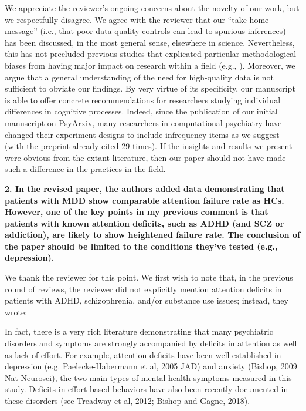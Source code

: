 \documentclass[a4paper,notitlepage,12pt]{article}
\begin{document}
We appreciate the reviewer's ongoing concerns about the novelty of our work, but we respectfully disagree. We agree with the reviewer that our ``take-home message'' (i.e., that poor data quality controls can lead to spurious inferences) has been discussed, in the most general sense, elsewhere in science. Nevertheless, this has not precluded previous studies that explicated particular methodological biases from having major impact on research within a field (e.g., \cite{eklund2016cluster, bradley2021unrepresentative}). Moreover, we argue that a general understanding of the need for high-quality data is not sufficient to obviate our findings. By very virtue of its specificity, our manuscript is able to offer concrete recommendations for researchers studying individual differences in cognitive processes. Indeed, since the publication of our initial manuscript on PsyArxiv, many researchers in computational psychiatry have changed their experiment designs to include infrequency items as we suggest (with the preprint already cited 29 times). If the insights and results we present were obvious from the extant literature, then our paper should not have made such a difference in the practices in the field.

\textbf{2. In the revised paper, the authors added data demonstrating that patients with MDD show comparable attention failure rate as HCs. However, one of the key points in my previous comment is that patients with known attention deficits, such as ADHD (and SCZ or addiction), are likely to show heightened failure rate. The conclusion of the paper should be limited to the conditions they've tested (e.g., depression).}

We thank the reviewer for this point. We first wish to note that, in the previous round of reviews, the reviewer did not explicitly mention attention deficits in patients with ADHD, schizophrenia, and/or substance use issues; instead, they wrote:

\begin{displayquote}
    In fact, there is a very rich literature demonstrating that many psychiatric disorders and symptoms are strongly accompanied by deficits in attention as well as lack of effort. For example, attention deficits have been well established in depression (e.g. Paelecke-Habermann et al, 2005 JAD) and anxiety (Bishop, 2009 Nat Neurosci), the two main types of mental health symptoms measured in this study. Deficits in effort-based behaviors have also been recently documented in these disorders (see Treadway et al, 2012; Bishop and Gagne, 2018).
\end{displayquote}
\end{document}
